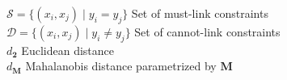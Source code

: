 \begin{tabbing}
$\mathcal{S} = \{ (x_i, x_j) \mid y_i = y_j \}$ \> Set of must-link constraints \\
$\mathcal{D} = \{ (x_i, x_j) \mid y_i \neq y_j \}$ \> Set of cannot-link constraints \\

$d_{\bm{2}}$ \> Euclidean distance \\
$d_{\bm{M}}$ \> Mahalanobis distance parametrized by $\bm{M}$ \\




\end{tabbing} 
